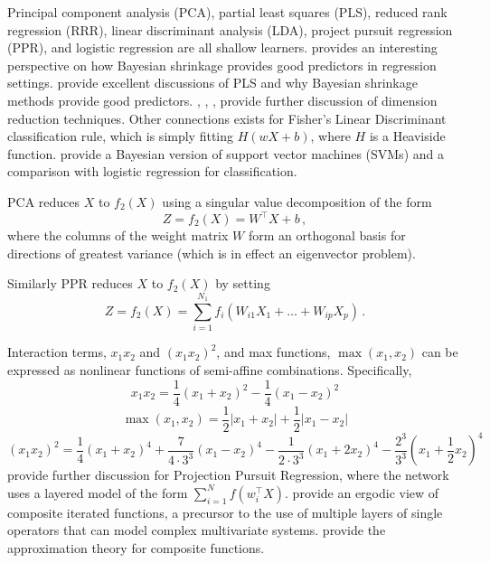 \documentclass[12pt]{article}
\begin{document}
Principal component analysis (PCA), partial least squares (PLS), reduced rank regression (RRR), linear discriminant analysis (LDA), project pursuit regression (PPR), 
and logistic regression are all shallow learners. 
\cite{mallows1973some} provides an interesting perspective on how Bayesian shrinkage provides good predictors in regression settings.
\cite{frank1993statistical} provide excellent discussions of PLS and why Bayesian shrinkage methods provide good predictors.
 \cite{wold1956causal}, \cite{diaconis_nonlinear_1984}, \cite{ripley1994neural}, \cite{cook_fisher_2007,hastie_elements_2016} provide further discussion of dimension reduction techniques.
Other connections exists for Fisher's Linear Discriminant classification rule, which is simply fitting $ H( wX + b)$, where $H$ is a Heaviside function.  \cite{polson_proximal_2015} provide a Bayesian version of support vector machines (SVMs) and a comparison with logistic regression for classification. 

PCA reduces $X$ to $f_2(X)$ using a
singular value decomposition of the form
\begin{equation}
Z =  f_2(X) = W^\top X + b\,,\label{PCA_eq}
\end{equation}
where the columns of the weight matrix $W$ form an orthogonal basis for directions of greatest variance (which is in effect an eigenvector problem). 

Similarly PPR reduces $X$ to $f_2(X)$ by setting
$$
Z=f_2(X) = \sum^{N_1}_{i=1}f_i(W_{i1}X_1 + \ldots + W_{ip}X_p)\,.
$$

Interaction terms, $ x_1 x_2 $ and $ (x_1 x_2)^2 $, and max functions, $ \max (x_1, x_2) $  can be expressed as nonlinear functions of semi-affine combinations.
Specifically,  
$$
x_1x_2 = \frac{1}{4} ( x_1+x_2 )^2 - \frac{1}{4} (x_1-x_2)^2
$$
$$
\max(x_1,x_2) = \frac{1}{2} | x_1+x_2 | + \frac{1}{2} | x_1-x_2 |
$$
$$
(x_1x_2)^2 = \frac{1}{4} ( x_1+x_2 )^4 + \frac{7}{4 \cdot 3^3} (x_1-x_2)^4 - \frac{1}{2 \cdot 3^3} ( x_1+ 2 x_2)^4 - \frac{2^3}{3^3} ( x_1 + \frac{1}{2} x_2 )^4
$$
\cite{diaconis1981generating} provide further discussion for Projection Pursuit Regression, where the network uses a layered model of the form
$ \sum_{i=1}^N f ( w_i^\top X ) $. \cite{diaconis1998consistency} provide an ergodic view of composite iterated functions, a precursor to the use of multiple layers of single operators that
can model complex multivariate systems.
\cite{sjoberg1995nonlinear} provide the approximation theory for composite functions.
\end{document}
